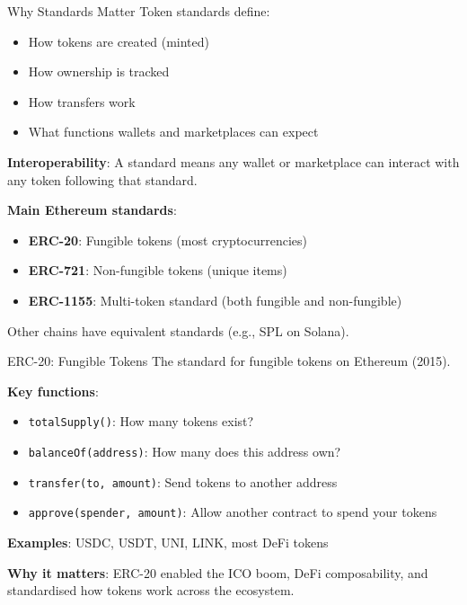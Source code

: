 \documentclass[10pt]{beamer}
\begin{document}
\begin{frame}{Why Standards Matter}
  Token standards define:
  \begin{itemize}
    \item How tokens are created (minted)
    \item How ownership is tracked
    \item How transfers work
    \item What functions wallets and marketplaces can expect
  \end{itemize}
  
  \vspace{1em}
  \textbf{Interoperability}: A standard means any wallet or marketplace can interact with any token following that standard.
  
  \vspace{1em}
  \textbf{Main Ethereum standards}:
  \begin{itemize}
    \item \textbf{ERC-20}: Fungible tokens (most cryptocurrencies)
    \item \textbf{ERC-721}: Non-fungible tokens (unique items)
    \item \textbf{ERC-1155}: Multi-token standard (both fungible and non-fungible)
  \end{itemize}
  
  \vspace{0.5em}
  Other chains have equivalent standards (e.g., SPL on Solana).
\end{frame}

\begin{frame}{ERC-20: Fungible Tokens}
  The standard for fungible tokens on Ethereum (2015).
  
  \vspace{0.5em}
  \textbf{Key functions}:
  \begin{itemize}
    \item \texttt{totalSupply()}: How many tokens exist?
    \item \texttt{balanceOf(address)}: How many does this address own?
    \item \texttt{transfer(to, amount)}: Send tokens to another address
    \item \texttt{approve(spender, amount)}: Allow another contract to spend your tokens
  \end{itemize}
  
  \vspace{1em}
  \textbf{Examples}: USDC, USDT, UNI, LINK, most DeFi tokens
  
  \vspace{1em}
  \textbf{Why it matters}: ERC-20 enabled the ICO boom, DeFi composability, and standardised how tokens work across the ecosystem.
\end{frame}
\end{document}
